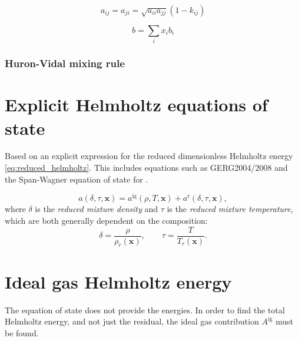 \documentclass[internal,english]{sintefmemo2012}
\newcommand*{\vektor}[1]{\boldsymbol{#1}}%
\begin{document}
\begin{equation}
  a_{ij} = a_{ji} = \sqrt{a_{ii} a_{jj}} \left( 1-k_{ij} \right)
  \label{}
\end{equation}

\begin{equation}
  b = \sum_i x_i b_i
  \label{}
\end{equation}


\subsubsection{Huron-Vidal mixing rule}



\section{Explicit Helmholtz equations of state}
Based on an explicit expression for the reduced dimensionless Helmholtz energy \eqref{eq:reduced_helmholtz}. This includes 
equations such as GERG2004/2008 and the Span-Wagner equation of state for .

\begin{equation}
  a(\delta,\tau,\vektor{x}) = a^\text{ig}(\rho,T,\vektor{x}) + a^\text{r}(\delta,\tau,\vektor{x}),
  \label{}
\end{equation}
where $\delta$ is the \textit{reduced mixture density} and $\tau$ is the \textit{reduced mixture temperature}, which are both generally 
dependent on the composition:
\begin{equation}
  \delta = \frac{\rho}{\rho_r(\vektor{x})}, \quad \quad \tau = \frac{T}{T_r(\vektor{x})}.
  \label{}
\end{equation}


\section{Ideal gas Helmholtz energy}
The equation of state does not provide the energies.
In order to find the total Helmholtz energy, and not just the residual, 
the ideal gas contribution $A^\text{ig}$ must be found.
\end{document}
